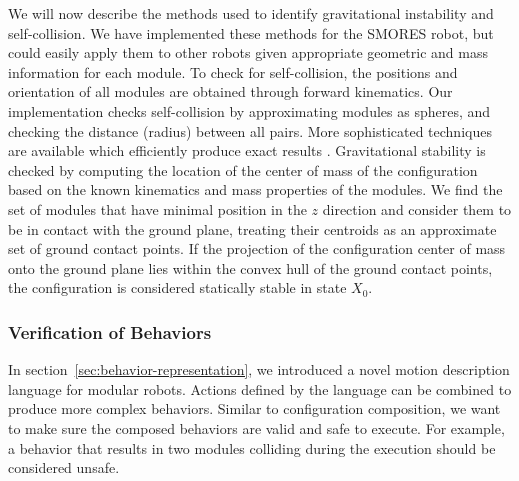 \documentclass[graybox]{svmult}
\begin{document}
We will now describe the methods used to identify gravitational instability and
self-collision. We have implemented these methods for the SMORES robot, but
could easily apply them to other robots given appropriate geometric and mass
information for each module. 
%
To check for self-collision, the positions and orientation of all modules are
obtained  through forward kinematics.
Our implementation checks self-collision by
approximating modules as spheres, and checking the distance (radius) between all
pairs. More sophisticated techniques are available which efficiently produce
exact results \cite{pan2012fcl}.
%
Gravitational stability is checked by computing the location of the center of
mass of the configuration based on the known kinematics and mass properties of 
the modules.
%
We find the set of modules that have minimal position in the $z$ direction and consider them to
be in contact with the ground plane, treating their centroids as an approximate
set of ground contact points.
If the projection of the configuration center of mass onto the ground plane
lies within the convex hull of the ground contact points, the configuration
is considered statically stable in state \(X_0\).

\subsubsection{Verification of Behaviors}
In section~\ref{sec:behavior-representation}, we introduced a novel motion description language for modular robots. Actions defined by the language can be combined to produce more complex behaviors. Similar to configuration composition, we want to make sure the composed behaviors are valid and safe to execute. For example, a behavior that results in two modules colliding during the execution should be considered unsafe.
\end{document}
